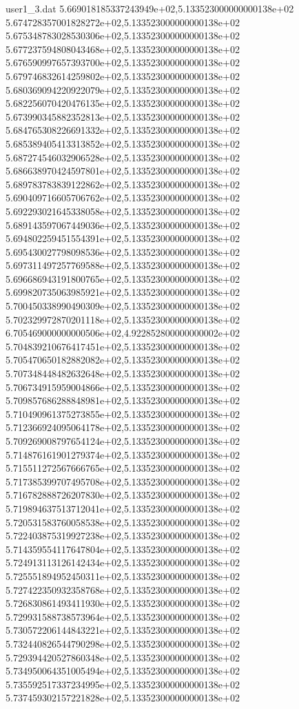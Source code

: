 \begin{filecontents}{user1_3.dat}
5.669018185337243949e+02,5.133523000000000138e+02
5.674728357001828272e+02,5.133523000000000138e+02
5.675348783028530306e+02,5.133523000000000138e+02
5.677237594808043468e+02,5.133523000000000138e+02
5.676590997657393700e+02,5.133523000000000138e+02
5.679746832614259802e+02,5.133523000000000138e+02
5.680369094220922079e+02,5.133523000000000138e+02
5.682256070420476135e+02,5.133523000000000138e+02
5.673990345882352813e+02,5.133523000000000138e+02
5.684765308226691332e+02,5.133523000000000138e+02
5.685389405413313852e+02,5.133523000000000138e+02
5.687274546032906528e+02,5.133523000000000138e+02
5.686638970424597801e+02,5.133523000000000138e+02
5.689783783839122862e+02,5.133523000000000138e+02
5.690409716605706762e+02,5.133523000000000138e+02
5.692293021645338058e+02,5.133523000000000138e+02
5.689143597067449036e+02,5.133523000000000138e+02
5.694802259451554391e+02,5.133523000000000138e+02
5.695430027798098536e+02,5.133523000000000138e+02
5.697311497257769588e+02,5.133523000000000138e+02
5.696686943191800765e+02,5.133523000000000138e+02
5.699820735063985921e+02,5.133523000000000138e+02
5.700450338990490309e+02,5.133523000000000138e+02
5.702329972870201118e+02,5.133523000000000138e+02
6.705469000000000506e+02,4.922852800000000002e+02
5.704839210676417451e+02,5.133523000000000138e+02
5.705470650182882082e+02,5.133523000000000138e+02
5.707348448482632648e+02,5.133523000000000138e+02
5.706734915959004866e+02,5.133523000000000138e+02
5.709857686288848981e+02,5.133523000000000138e+02
5.710490961375273855e+02,5.133523000000000138e+02
5.712366924095064178e+02,5.133523000000000138e+02
5.709269008797654124e+02,5.133523000000000138e+02
5.714876161901279374e+02,5.133523000000000138e+02
5.715511272567666765e+02,5.133523000000000138e+02
5.717385399707495708e+02,5.133523000000000138e+02
5.716782888726207830e+02,5.133523000000000138e+02
5.719894637513712041e+02,5.133523000000000138e+02
5.720531583760058538e+02,5.133523000000000138e+02
5.722403875319927238e+02,5.133523000000000138e+02
5.714359554117647804e+02,5.133523000000000138e+02
5.724913113126142434e+02,5.133523000000000138e+02
5.725551894952450311e+02,5.133523000000000138e+02
5.727422350932358768e+02,5.133523000000000138e+02
5.726830861493411930e+02,5.133523000000000138e+02
5.729931588738573964e+02,5.133523000000000138e+02
5.730572206144843221e+02,5.133523000000000138e+02
5.732440826544790298e+02,5.133523000000000138e+02
5.729394420527860348e+02,5.133523000000000138e+02
5.734950064351005494e+02,5.133523000000000138e+02
5.735592517337234995e+02,5.133523000000000138e+02
5.737459302157221828e+02,5.133523000000000138e+02

\end{filecontents}

